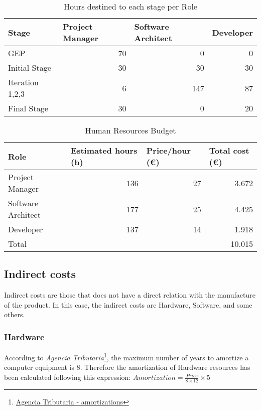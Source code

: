 \begin{table}[h!]
	\centering
	\begin{tabular}{|l|r|r|r|}
		\hline
		Stage & \multicolumn{1}{l|}{Project Manager} & \multicolumn{1}{l|}{Software Architect} & \multicolumn{1}{l|}{Developer} \\ \hline
		GEP & 70 & 0 & 0 \\ \hline
		Initial Stage & 30 & 30 & 30 \\ \hline
		Iteration 1,2,3 & 6 & 147 & 87 \\ \hline
		Final Stage & 30 & 0 & 20 \\ \hline
	\end{tabular}
	\caption{Hours destined to each stage per Role}
	\label{StageResources}
\end{table}
\begin{table}[h!]
	\centering
	\begin{tabular}{|l|r|r|r|}
		\hline
		Role & \multicolumn{1}{l|}{Estimated hours (h)} & \multicolumn{1}{l|}{Price/hour (€)} & \multicolumn{1}{l|}{Total cost (€)} \\ \hline
		Project Manager & 136 & 27  & 3.672 \\ \hline
		Software Architect & 177 & 25 & 4.425 \\ \hline
		Developer & 137 & 14 & 1.918 \\ \hline\hline
		Total & \multicolumn{3}{r|}{10.015} \\ \hline
	\end{tabular}
	\caption{Human Resources Budget}
	\label{HumanResources}
\end{table}

\subsection{Indirect costs}
Indirect costs are those that does not have a direct relation with the manufacture of the product. In this case, the indirect costs are Hardware, Software, and some others. 

\subsubsection{Hardware}

According to \emph{Agencia Tributaria}\footnote{\href{http://www.agenciatributaria.es/AEAT.internet/en_gb/Inicio/_Segmentos_/Empresas_y_profesionales/Empresas/Impuesto_sobre_Sociedades/Periodos_impositivos_a_partir_de_1_1_2015/Base_imponible/Amortizacion/Tabla_de_coeficientes_de_amortizacion_lineal_.shtml} {Agencia Tributaria - amortizations}}, the maximum number of years to amortize a computer equipment is 8. Therefore the amortization of Hardware resources has been calculated following this expression: $Amortization = \frac{Price}{8\times12} \times 5$

